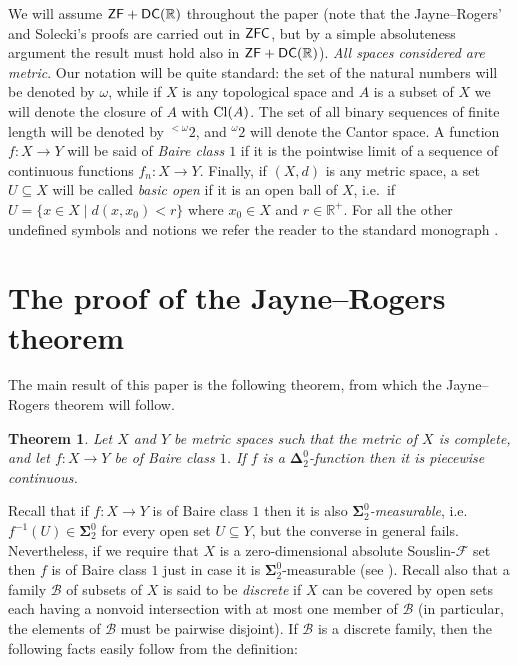 \documentclass{rae}
\newcommand{\RR}{\ensuremath{\mathbb{R}}}
\def\Cl{{\rm Cl}}
\newcommand{\Can}{\ensuremath{{}^\omega 2}}
\newcommand{\ZFC}{\ensuremath{{\rm \mathsf{ZFC}}}}
\newcommand{\ZF}{\ensuremath{{\rm \mathsf{ZF}}}}
\newcommand{\DCR}{\ensuremath{{\rm \mathsf{DC}(\mathbb{R})}}}
\newcommand{\B}{\mathcal{B}}
\newcommand{\bSigma}{\mathbf{\Sigma}}
\newcommand{\bDelta}{\mathbf{\Delta}}
\newcommand{\bN}{\mathbf{N}}
\newtheorem{theorem}{Theorem}[section]
\theoremstyle{definition}
\begin{document}
We will assume $\ZF+\DCR$ throughout the paper (note that the 
Jayne--Rogers' and Solecki's proofs are carried out in $\ZFC$, 
but by a simple absoluteness argument the result must hold also 
in $\ZF+\DCR$). \emph{All spaces considered are metric}.
Our notation will be quite standard: the set of 
the natural numbers will be denoted by $\omega$, while if $X$ is 
any topological space and $A$ is a subset of $X$ we will denote 
the closure of $A$ with $\Cl(A)$. The set of all binary sequences
 of finite length will be denoted by  ${}^{<\omega}2$, and $\Can$ will
 denote the Cantor space.
A function $f \colon X \to Y$
will be said of \emph{Baire class $1$} if it is the pointwise limit
of a sequence of continuous functions $f_n \colon X \to Y$. 
Finally, if $(X,d)$ is any metric
 space, a set $U \subseteq X$ will be called \emph{basic open} if it
 is an open ball of $X$, i.e.\ if $U = \{ x \in X \mid d(x,x_0) < r\}$
 where $x_0 \in X$ and $r \in \RR^+$. For all the other undefined 
symbols and notions we refer the reader to the standard monograph 
\cite{kechris}. 


\section{The proof of the Jayne--Rogers theorem}\label{sectionJR}


The main result of this paper is the following theorem, from
which the Jayne--Rogers theorem will follow.

\begin{theorem}\label{theorJR}
Let $X$ and $Y$ be metric spaces such that the metric of  $X$ is complete, 
and let $f\colon X \to Y$ be of Baire
class $1$. If $f$ is a $\bDelta^0_2$-function then it is piecewise
continuous.
\end{theorem}

Recall that if $f\colon X \to Y$ is of Baire class $1$ then it is also
\emph{$\bSigma^0_2$-measurable}, i.e.\ $f^{-1}(U) \in \bSigma^0_2$ for
every open set $U\subseteq Y$, but the converse in general fails. 
Nevertheless, if we require that $X$ is a zero-dimensional absolute
Souslin-$\mathscr{F}$ set then $f$ is 
of Baire class $1$ just in case it is $\bSigma^0_2$-measurable (see 
\cite[Theorem 8]{hansell}). Recall also that a family $\B$ of
subsets of $X$ is said to be \emph{discrete} if $X$ can be covered by
open sets each having a nonvoid intersection with at most one member of
$\B$ (in particular, the elements of $\B$ must be pairwise
disjoint). If $\B$ is a discrete family, then the following facts
easily follow from the definition:
\end{document}
